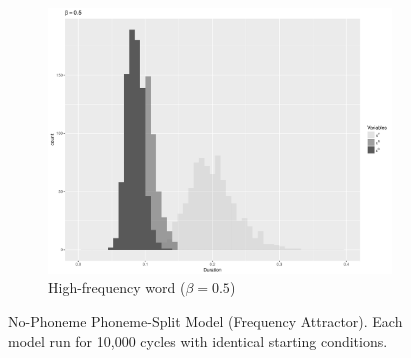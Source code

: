 \begin{figure}[h]
\begin{subfigure}[t]{.3\textwidth}
        \includegraphics[width=\linewidth]{figures/SpeakingRateFrequencybeta5.pdf}
        \caption{High-frequency word ($\beta=0.5$)}
    \end{subfigure}

\caption{\label{fig:NasalizationModel1}No-Phoneme Phoneme-Split Model (Frequency Attractor). Each model run for 10,000 cycles with identical starting conditions.}\end{figure}

